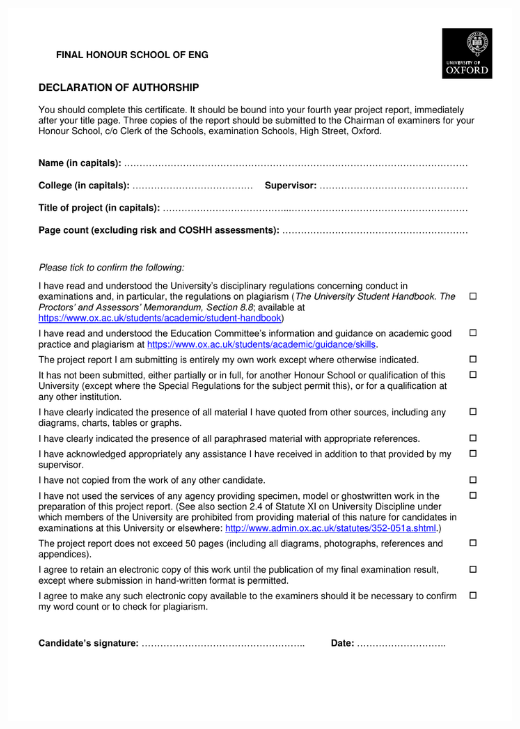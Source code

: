 \documentclass[11pt, oneside]{report}   	%
\newenvironment{changemargin}[3]{%
\begin{list}{}{%
\setlength{\topsep}{0pt}%
\setlength{\leftmargin}{#1}%
\setlength{\rightmargin}{#2}%
\setlength{\topmargin}{#3}%
\setlength{\listparindent}{\parindent}%
\setlength{\itemindent}{\parindent}%
\setlength{\parsep}{\parskip}%
}%
\item[]}{\end{list}}
\begin{document}
\begin{changemargin}{-1in}{0in}{-1.5in}
\includegraphics{Declaration_of_Authorship_form_2018.pdf}
\thispagestyle{empty}
\end{changemargin}
\end{document}
